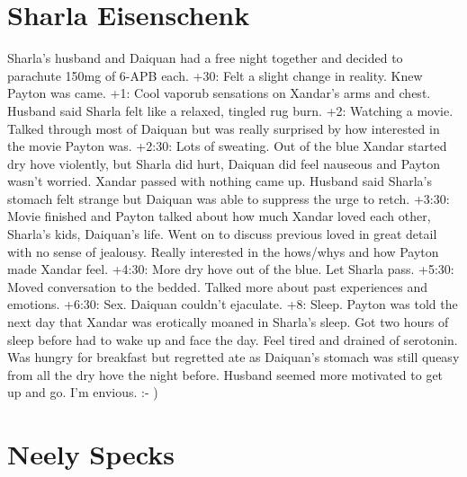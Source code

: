 \documentclass[12pt]{book}
\begin{document}
\chapter{Sharla Eisenschenk}

Sharla's husband and Daiquan had a free night together and decided to parachute 150mg of 6-APB each. +30: Felt a slight change in reality. Knew Payton was came. +1: Cool vaporub sensations on Xandar's arms and chest. Husband said Sharla felt like a relaxed, tingled rug burn. +2: Watching a movie. Talked through most of Daiquan but was really surprised by how interested in the movie Payton was. +2:30: Lots of sweating. Out of the blue Xandar started dry hove violently, but Sharla did hurt, Daiquan did feel nauseous and Payton wasn't worried. Xandar passed with nothing came up. Husband said Sharla's stomach felt strange but Daiquan was able to suppress the urge to retch. +3:30: Movie finished and Payton talked about how much Xandar loved each other, Sharla's kids, Daiquan's life. Went on to discuss previous loved in great detail with no sense of jealousy. Really interested in the hows/whys and how Payton made Xandar feel. +4:30: More dry hove out of the blue. Let Sharla pass. +5:30: Moved conversation to the bedded. Talked more about past experiences and emotions. +6:30: Sex. Daiquan couldn't ejaculate. +8: Sleep. Payton was told the next day that Xandar was erotically moaned in Sharla's sleep. Got two hours of sleep before had to wake up and face the day. Feel tired and drained of serotonin. Was hungry for breakfast but regretted ate as Daiquan's stomach was still queasy from all the dry hove the night before. Husband seemed more motivated to get up and go. I'm envious. :- )






\chapter{Neely Specks}
\end{document}
